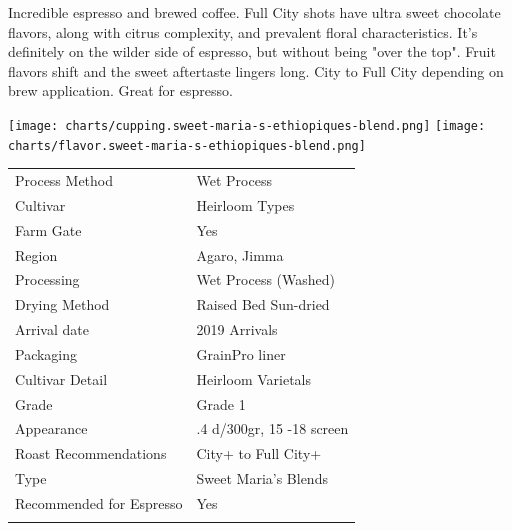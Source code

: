 \documentclass[10pt,twoside,footinclude=true,headinclude=true]{scrbook} %
\newlength{\mysize}
\newcommand{\myfontsize}[1]{
  \setlength{\mysize}{#1pt}
  \fontsize{\mysize}{1.2\mysize}
  \selectfont
}
\begin{document}
\begin{addmargin}[2.2em]{2.2em}
\small
\justify
Incredible espresso and brewed coffee. Full City shots have ultra sweet chocolate flavors, along with citrus complexity, and prevalent floral characteristics. It's definitely on the wilder side of espresso, but without being "over the top". Fruit flavors shift and the sweet aftertaste lingers long. City to Full City depending on brew application. Great for espresso.
\end{addmargin}

\centering
\vspace{2em}
\texttt{[image: charts/cupping.sweet-maria-s-ethiopiques-blend.png]}
\texttt{[image: charts/flavor.sweet-maria-s-ethiopiques-blend.png]}

\vspace{1em}
\begin{table}[htbp]
\myfontsize{7}
\hspace*{2.2em}
\begin{tabular}{ >{\raggedleft\arraybackslash}p{3.6cm}!{\color{lightgray}\vrule}p{7cm} }
\hline
  Process Method & Wet Process \\
  \hline
  Cultivar & Heirloom Types \\
  \hline
  Farm Gate & Yes \\
  \hline
  Region & Agaro, Jimma \\
  \hline
  Processing & Wet Process (Washed) \\
  \hline
  Drying Method & Raised Bed Sun-dried \\
  \hline
  Arrival date & 2019 Arrivals \\
  \hline
  Packaging & GrainPro liner \\
  \hline
  Cultivar Detail & Heirloom Varietals \\
  \hline
  Grade & Grade 1 \\
  \hline
  Appearance & .4 d/300gr, 15 -18 screen \\
  \hline
  Roast Recommendations & City+ to Full City+ \\
  \hline
  Type & Sweet Maria's Blends \\
  \hline
  Recommended for Espresso & Yes \\
  \hline

\end{tabular}
\end{table}
\end{document}
